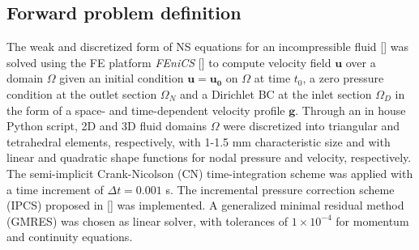 %
%
%
%

\subsection*{Forward problem definition}
The weak and discretized form of NS equations for an incompressible fluid [\cite{Stokes2009}] was solved using the FE platform \emph{FEniCS} [\cite{Alnaes2015}] to compute velocity field $\textbf{u}$ over a domain $\Omega$ given an initial condition \(\mathbf{u}=\mathbf{u_0}\) on $\Omega$ at time $t_0$, a zero pressure condition at the outlet section $\Omega_N$ and a Dirichlet BC at the inlet section $\Omega_D$ in the form of a space- and time-dependent velocity profile $\textbf{g}$. Through an in house Python script, 2D and 3D fluid domains $\Omega$ were discretized into triangular and tetrahedral elements, respectively, with 1-1.5 mm characteristic size and with linear and quadratic shape functions for nodal pressure and velocity, respectively. The semi-implicit Crank-Nicolson (CN) time-integration scheme was applied with a time increment of $\Delta t = 0.001$ s. The incremental pressure correction scheme (IPCS) proposed in [\cite{Goda1979}] was implemented. A generalized minimal residual method (GMRES) was chosen as linear solver, with tolerances of $1 \times 10^{-4}$ for momentum and continuity equations.

